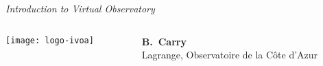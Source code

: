 \begin{frame}

  \begin{center}

    \emph{\Large Introduction to Virtual Observatory}\\

    \vspace{2em}
    \begin{columns}[T]
      \begin{column}{.5\textwidth}
        \texttt{[image: logo-ivoa]}
      \end{column}
      \begin{column}{.5\textwidth}
        \small
        \vspace{2cm}
        \textbf{B.~Carry}\\
        \footnotesize{Lagrange, Observatoire de la C{\^o}te d'Azur\\
          }
      \end{column}
    \end{columns}

  \end{center}

\end{frame}
